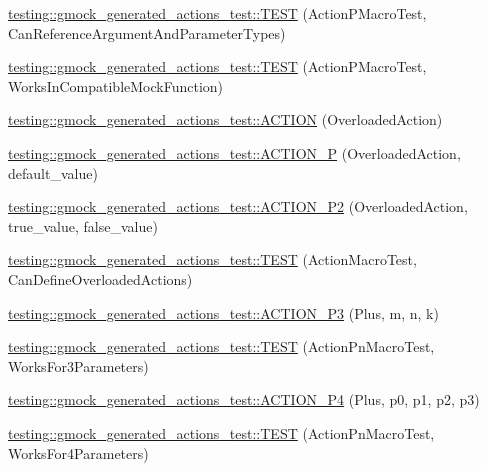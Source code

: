 \begin{DoxyCompactItemize}
\item 
\mbox{\hyperlink{namespacetesting_1_1gmock__generated__actions__test_a4262c10efb367abf9771b3060c57d190}{testing\+::gmock\+\_\+generated\+\_\+actions\+\_\+test\+::\+T\+E\+ST}} (Action\+P\+Macro\+Test, Can\+Reference\+Argument\+And\+Parameter\+Types)
\item 
\mbox{\hyperlink{namespacetesting_1_1gmock__generated__actions__test_ab545244777c7559d1b0c2c63ee2be134}{testing\+::gmock\+\_\+generated\+\_\+actions\+\_\+test\+::\+T\+E\+ST}} (Action\+P\+Macro\+Test, Works\+In\+Compatible\+Mock\+Function)
\item 
\mbox{\hyperlink{namespacetesting_1_1gmock__generated__actions__test_a24927d97882dc1d52e203720df804188}{testing\+::gmock\+\_\+generated\+\_\+actions\+\_\+test\+::\+A\+C\+T\+I\+ON}} (Overloaded\+Action)
\item 
\mbox{\hyperlink{namespacetesting_1_1gmock__generated__actions__test_a1ee92e8b8bd6a5a54f5d2fcdb9f122b8}{testing\+::gmock\+\_\+generated\+\_\+actions\+\_\+test\+::\+A\+C\+T\+I\+O\+N\+\_\+P}} (Overloaded\+Action, default\+\_\+value)
\item 
\mbox{\hyperlink{namespacetesting_1_1gmock__generated__actions__test_a233ee874462c7956e154945975da1127}{testing\+::gmock\+\_\+generated\+\_\+actions\+\_\+test\+::\+A\+C\+T\+I\+O\+N\+\_\+\+P2}} (Overloaded\+Action, true\+\_\+value, false\+\_\+value)
\item 
\mbox{\hyperlink{namespacetesting_1_1gmock__generated__actions__test_a8a3d26365bdae172067fe3a63bd88e85}{testing\+::gmock\+\_\+generated\+\_\+actions\+\_\+test\+::\+T\+E\+ST}} (Action\+Macro\+Test, Can\+Define\+Overloaded\+Actions)
\item 
\mbox{\hyperlink{namespacetesting_1_1gmock__generated__actions__test_a35c62beac532eaff7e54b8ad4a7fe1cf}{testing\+::gmock\+\_\+generated\+\_\+actions\+\_\+test\+::\+A\+C\+T\+I\+O\+N\+\_\+\+P3}} (Plus, m, n, k)
\item 
\mbox{\hyperlink{namespacetesting_1_1gmock__generated__actions__test_a3579cf2428f584d2a837c2c219ec1d5a}{testing\+::gmock\+\_\+generated\+\_\+actions\+\_\+test\+::\+T\+E\+ST}} (Action\+Pn\+Macro\+Test, Works\+For3\+Parameters)
\item 
\mbox{\hyperlink{namespacetesting_1_1gmock__generated__actions__test_ac86e9e1fa5be82823e80247ba093301c}{testing\+::gmock\+\_\+generated\+\_\+actions\+\_\+test\+::\+A\+C\+T\+I\+O\+N\+\_\+\+P4}} (Plus, p0, p1, p2, p3)
\item 
\mbox{\hyperlink{namespacetesting_1_1gmock__generated__actions__test_a6c13e382007960236763d638542bc5fe}{testing\+::gmock\+\_\+generated\+\_\+actions\+\_\+test\+::\+T\+E\+ST}} (Action\+Pn\+Macro\+Test, Works\+For4\+Parameters)

\end{DoxyCompactItemize}
